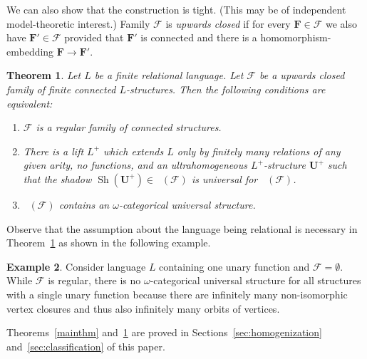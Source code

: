 \documentclass{elsarticle}
\def\Forb{\mathop{\mathrm{Forb_{he}}}\nolimits}
\def\sh{\mathop{\mathrm{Sh}}\nolimits}
\def\str#1{\mathbf {#1}}
\def\F{{\mathcal F}}
\theoremstyle{plain}
\newtheorem{theorem}{Theorem}[section]
\theoremstyle{definition}
\newtheorem{example}[theorem]{Example}
\theoremstyle{remark}
\begin{document}
We can also show that the construction is tight. (This may be of independent model-theoretic interest.)
Family $\F$ is \emph{upwards closed} if for every $\str{F}\in \F$ we also have $\str{F}'\in \F$
provided that $\str{F}'$ is connected and there is a homomorphism-embedding $\str{F}\to \str{F}'$.
\begin{theorem}
\label{mainthm2}
Let $L$ be a finite relational language.
Let $\F$ be a upwards closed family of finite connected $L$-structures.
Then the following conditions are equivalent:
\begin{enumerate}[label=$(\alph*)$]
 \item\label{mainthm2:a} $\F$ is a regular family of connected structures.
 \item\label{mainthm2:b} There is a lift $L^+$ which extends $L$ only by finitely many relations of any given arity, no functions, and an ultrahomogeneous $L^+$-structure $\str{U}^+$ such that the shadow $\sh(\str{U}^+)\in \Forb(\F)$ is universal for $\Forb(\F)$.
 \item\label{mainthm2:c} $\Forb(\F)$ contains an $\omega$-categorical universal structure.
\end{enumerate}
\end{theorem}
Observe that the assumption about the language being relational is necessary in Theorem~\ref{mainthm2}
as shown in the following example.
\begin{example}
Consider language $L$ containing one unary function and $\F=\emptyset$.
While $\F$ is regular, there is no $\omega$-categorical universal structure for all structures with
a single unary function because there are infinitely many non-isomorphic vertex closures and thus also infinitely many
orbits of vertices.
\end{example}


Theorems~\ref{mainthm} and~\ref{mainthm2} are proved in Sections~\ref{sec:homogenization} and~\ref{sec:classification}  of this paper.
\end{document}
